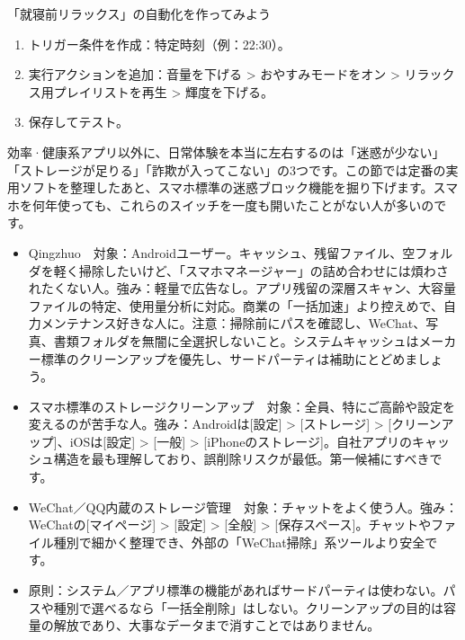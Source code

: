 \begin{tcbpractice}{「就寝前リラックス」の自動化を作ってみよう}
\begin{enumerate}
  \item トリガー条件を作成：特定時刻（例：22:30）。
  \item 実行アクションを追加：音量を下げる > おやすみモードをオン > リラックス用プレイリストを再生 > 輝度を下げる。
  \item 保存してテスト。
\end{enumerate}

\end{tcbpractice}


効率·健康系アプリ以外に、日常体験を本当に左右するのは「迷惑が少ない」「ストレージが足りる」「詐欺が入ってこない」の3つです。この節では定番の実用ソフトを整理したあと、スマホ標準の迷惑ブロック機能を掘り下げます。スマホを何年使っても、これらのスイッチを一度も開いたことがない人が多いのです。


\begin{itemize}
  \item Qingzhuo　対象：Androidユーザー。キャッシュ、残留ファイル、空フォルダを軽く掃除したいけど、「スマホマネージャー」の詰め合わせには煩わされたくない人。強み：軽量で広告なし。アプリ残留の深層スキャン、大容量ファイルの特定、使用量分析に対応。商業の「一括加速」より控えめで、自力メンテナンス好きな人に。注意：掃除前にパスを確認し、WeChat、写真、書類フォルダを無闇に全選択しないこと。システムキャッシュはメーカー標準のクリーンアップを優先し、サードパーティは補助にとどめましょう。
  \item スマホ標準のストレージクリーンアップ　対象：全員、特にご高齢や設定を変えるのが苦手な人。強み：Androidは[設定] > [ストレージ] > [クリーンアップ]、iOSは[設定] > [一般] > [iPhoneのストレージ]。自社アプリのキャッシュ構造を最も理解しており、誤削除リスクが最低。第一候補にすべきです。
  \item WeChat／QQ内蔵のストレージ管理　対象：チャットをよく使う人。強み：WeChatの[マイページ] > [設定] > [全般] > [保存スペース]。チャットやファイル種別で細かく整理でき、外部の「WeChat掃除」系ツールより安全です。
  \item 原則：システム／アプリ標準の機能があればサードパーティは使わない。パスや種別で選べるなら「一括全削除」はしない。クリーンアップの目的は容量の解放であり、大事なデータまで消すことではありません。
\end{itemize}

